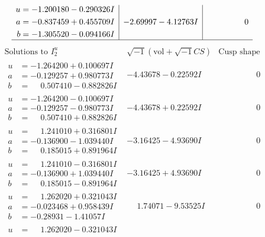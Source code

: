 \documentclass[1p]{elsarticle_modified}
\theoremstyle{definition}
\newcommand{\I}{\sqrt{-1}}
\begin{document}
$$\begin{array}{c|c|c}
\begin{aligned}
u &= -1.200180 - 0.290326 I \\
a &= -0.837459 + 0.455709 I \\
b &= -1.305520 - 0.094166 I\end{aligned}
 & -2.69997 - 4.12763 I & \phantom{-0.000000 } 0\\
 \hline 
 \end{array}$$\newpage$$\begin{array}{c|c|c}  
\text{Solutions to }I^u_{2}& \I (\text{vol} + \sqrt{-1}CS) & \text{Cusp shape}\\
 \hline 
\begin{aligned}
u &= -1.264200 + 0.100697 I \\
a &= -0.129257 + 0.980773 I \\
b &= \phantom{-}0.507410 - 0.882826 I\end{aligned}
 & -4.43678 - 0.22592 I & \phantom{-0.000000 } 0 \\ \hline\begin{aligned}
u &= -1.264200 - 0.100697 I \\
a &= -0.129257 - 0.980773 I \\
b &= \phantom{-}0.507410 + 0.882826 I\end{aligned}
 & -4.43678 + 0.22592 I & \phantom{-0.000000 } 0 \\ \hline\begin{aligned}
u &= \phantom{-}1.241010 + 0.316801 I \\
a &= -0.136900 - 1.039440 I \\
b &= \phantom{-}0.185015 + 0.891964 I\end{aligned}
 & -3.16425 - 4.93690 I & \phantom{-0.000000 } 0 \\ \hline\begin{aligned}
u &= \phantom{-}1.241010 - 0.316801 I \\
a &= -0.136900 + 1.039440 I \\
b &= \phantom{-}0.185015 - 0.891964 I\end{aligned}
 & -3.16425 + 4.93690 I & \phantom{-0.000000 } 0 \\ \hline\begin{aligned}
u &= \phantom{-}1.262020 + 0.321043 I \\
a &= -0.023468 + 0.958439 I \\
b &= -0.28931 - 1.41057 I\end{aligned}
 & \phantom{-}1.74071 - 9.53525 I & \phantom{-0.000000 } 0 \\ \hline\begin{aligned}
u &= \phantom{-}1.262020 - 0.321043 I \\

\end{aligned}
\end{array}$$
\end{document}
